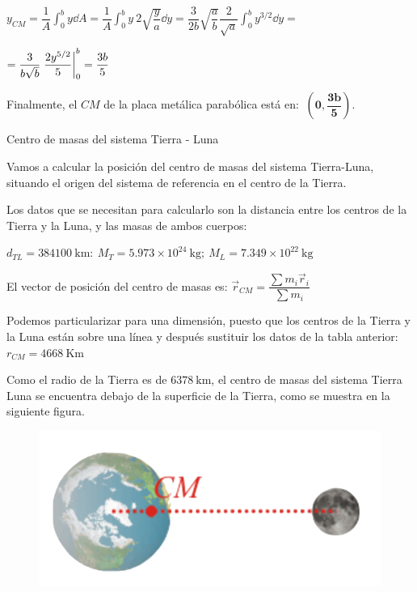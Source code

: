 $\displaystyle y_{CM}=\dfrac 1 A \int_0^b  y \dd A = \dfrac 1 A\int_0^b y\ 2 \sqrt{\dfrac y a} \dd y = \dfrac {3}{2b} \sqrt{\dfrac a b} \dfrac {2}{\sqrt{a}} \int_0^b y^{3/2} \dd y = $

$= \displaystyle \dfrac{3}{b\sqrt{b}} \eval{\dfrac { 2y^{5/2} } {5} }_0^b=\dfrac{3b}{5}$

Finalmente, el $CM$ de la placa metálica parabólica está en: $\boldsymbol{ \ \left( 0,\dfrac{3b}{5} \right) }$.




\newpage %
\begin{myblock}{Centro de masas del sistema Tierra - Luna}
 \begin{small}
Vamos a calcular la posición del centro de masas del sistema Tierra-Luna, situando el origen del sistema de referencia en el centro de la Tierra.
 
\vspace{1mm} Los datos que se necesitan para calcularlo son la distancia entre los centros de la Tierra y la Luna, y las masas de ambos cuerpos: 

\vspace{1mm} $d_{TL}= 384100 \ \mathrm{km}:\  M_T= 5.973\times 10^{24} \  \mathrm{kg};\  M_L= 7.349\times 10^{22}\  \mathrm{kg}$

\vspace{1mm} El vector de posición del centro de masas es: 
$\vec r_{CM}=\dfrac{\sum m_i \vec r_i}{\sum m_i}$

\vspace{1mm}  Podemos particularizar para una dimensión, puesto que los centros de la Tierra y la Luna están sobre una línea y después sustituir los datos de la tabla anterior: $r_{CM}=4668\ \mathrm{Km}$

\begin{multicols}{2}
Como el radio de la Tierra es de $6378\ \mathrm{km}$, el centro de masas del sistema Tierra Luna se encuentra debajo de la superficie de la Tierra, como se muestra en la siguiente figura. 
\begin{figure}[H]
	\centering
	\includegraphics[width=.5\textwidth]{imagenes/imagenes12/T12IM01.png}
\end{figure}


\end{multicols}
\end{small}
\end{myblock}
